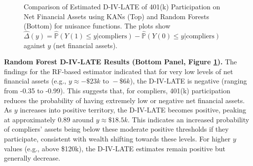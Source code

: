 \documentclass[final,3p,fleqn, 10pt]{elsarticle}
\begin{document}
\begin{figure}[htbp!]
    \centering
    
    \vspace{1em} %
    
    \caption{Comparison of Estimated D-IV-LATE of 401(k) Participation on Net Financial Assets using KANs (Top) and Random Forests (Bottom) for nuisance functions. The plots show $\hat{\Delta}(y) = \hat{\mathbb{P}}(Y(1) \le y | \text{compliers}) - \hat{\mathbb{P}}(Y(0) \le y | \text{compliers})$ against $y$ (net financial assets).}
    \label{fig:empirical_dlate_comparison}
\end{figure}

\textbf{Random Forest D-IV-LATE Results (Bottom Panel, Figure \ref{fig:empirical_dlate_comparison}).}
The findings for the RF-based estimator indicated that for very low levels of net financial assets (e.g., $y \approx -\$23k \text{ to } -\$6k$), the D-IV-LATE is negative (ranging from -0.35 to -0.99). This suggests that, for compliers, 401(k) participation reduces the probability of having extremely low or negative net financial assets. As $y$ increases into positive territory, the D-IV-LATE becomes positive, peaking at approximately 0.89 around $y \approx \$18.5k$. This indicates an increased probability of compliers' assets being below these moderate positive thresholds if they participate, consistent with wealth shifting towards these levels. For higher $y$ values (e.g., above \$120k), the D-IV-LATE estimates remain positive but generally decrease.
\end{document}
